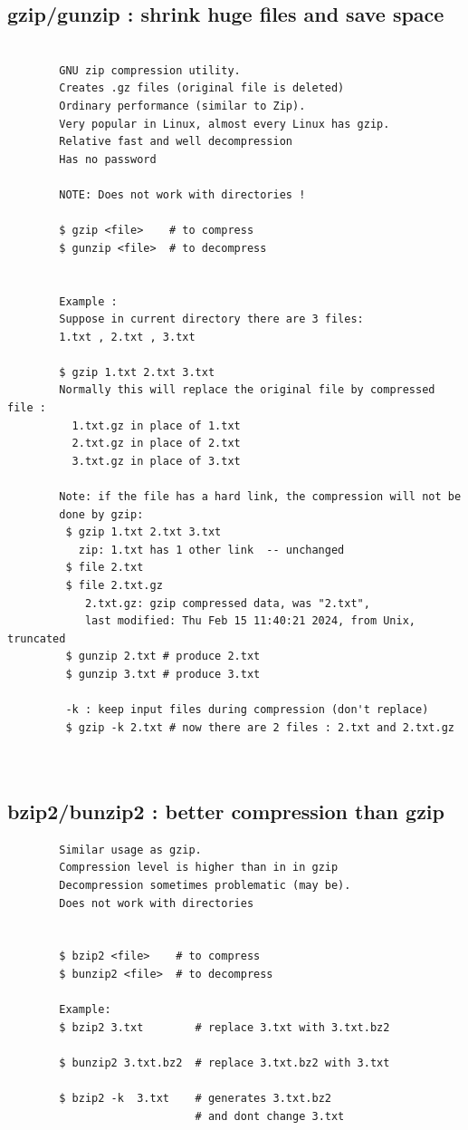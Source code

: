 \documentclass[a4paper,12pt]{article}
\begin{document}
\subsection{gzip/gunzip  : shrink huge files and save space}
\begin{verbatim}

        GNU zip compression utility. 
        Creates .gz files (original file is deleted)
        Ordinary performance (similar to Zip).
        Very popular in Linux, almost every Linux has gzip.
        Relative fast and well decompression  
        Has no password 
        
        NOTE: Does not work with directories !
         
        $ gzip <file>    # to compress  
        $ gunzip <file>  # to decompress
        
        
        Example : 
        Suppose in current directory there are 3 files:
        1.txt , 2.txt , 3.txt
        
        $ gzip 1.txt 2.txt 3.txt
        Normally this will replace the original file by compressed file : 
          1.txt.gz in place of 1.txt
          2.txt.gz in place of 2.txt
          3.txt.gz in place of 3.txt         
        
        Note: if the file has a hard link, the compression will not be 
        done by gzip: 
         $ gzip 1.txt 2.txt 3.txt
           zip: 1.txt has 1 other link  -- unchanged
         $ file 2.txt
         $ file 2.txt.gz
            2.txt.gz: gzip compressed data, was "2.txt", 
            last modified: Thu Feb 15 11:40:21 2024, from Unix, truncated
         $ gunzip 2.txt # produce 2.txt
         $ gunzip 3.txt # produce 3.txt
   
         -k : keep input files during compression (don't replace)
         $ gzip -k 2.txt # now there are 2 files : 2.txt and 2.txt.gz
         
         
\end{verbatim}

\subsection{bzip2/bunzip2  : better compression than gzip}
\begin{verbatim}
        Similar usage as gzip.         
        Compression level is higher than in in gzip
        Decompression sometimes problematic (may be).
        Does not work with directories
        
        
        $ bzip2 <file>    # to compress
        $ bunzip2 <file>  # to decompress
        
        Example: 
        $ bzip2 3.txt        # replace 3.txt with 3.txt.bz2
        
        $ bunzip2 3.txt.bz2  # replace 3.txt.bz2 with 3.txt
        
        $ bzip2 -k  3.txt    # generates 3.txt.bz2 
                             # and dont change 3.txt 
        
\end{verbatim}
\end{document}
